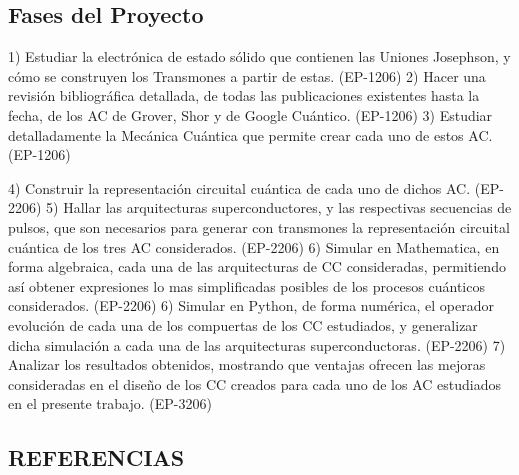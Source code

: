 \subsection{Fases del Proyecto}

1) Estudiar la electrónica de estado sólido que contienen las Uniones Josephson, y cómo se construyen los
Transmones a partir de estas. (EP-1206)
2) Hacer una revisión bibliográfica detallada, de todas las publicaciones existentes hasta la fecha, de los
AC de Grover, Shor y de Google Cuántico. (EP-1206)
3) Estudiar detalladamente la Mecánica Cuántica que permite crear cada uno de estos AC. (EP-1206)

4) Construir la representación circuital cuántica de cada uno de dichos AC. (EP-2206)
5) Hallar las arquitecturas superconductores, y las respectivas secuencias de pulsos, que son necesarios
para generar con transmones la representación circuital cuántica de los tres AC considerados. (EP-2206)
6) Simular en Mathematica, en forma algebraica, cada una de las arquitecturas de CC consideradas,
permitiendo así obtener expresiones lo mas simplificadas posibles de los procesos cuánticos considerados.
(EP-2206)
6) Simular en Python, de forma numérica, el operador evolución de cada una de los compuertas de los CC
estudiados, y generalizar dicha simulación a cada una de las arquitecturas superconductoras. (EP-2206)
7) Analizar los resultados obtenidos, mostrando que ventajas ofrecen las mejoras consideradas en el
diseño de los CC creados para cada uno de los AC estudiados en el presente trabajo. (EP-3206)





\subsection{REFERENCIAS}

